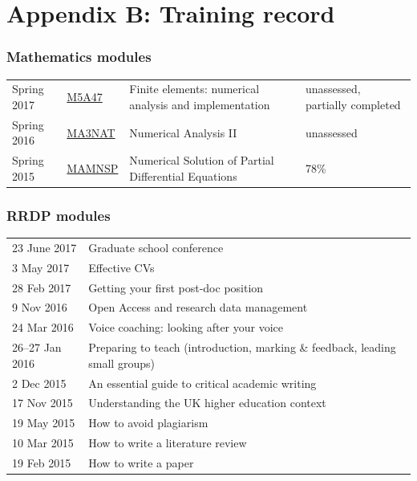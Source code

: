 \documentclass[a4paper,11pt]{article}
\begin{document}
\newpage

\section*{Appendix B: Training record}

\subsubsection*{Mathematics modules}
\footnotesize
\begin{tabular}{l l l l}
Spring 2017	& \href{https://finite-element.github.io}{M5A47}  & Finite elements: numerical analysis and implementation & unassessed, partially completed \\
Spring 2016	& \href{www.reading.ac.uk/module/document.aspx?modP=MA3NAT&modYR=1516}{MA3NAT} & Numerical Analysis II & unassessed \\
Spring 2015	& \href{www.reading.ac.uk/modules/document.aspx?modP=MAMNSP&modYR=1415}{MAMNSP} & Numerical Solution of Partial Differential Equations  & 78\% \\
\end{tabular}

\subsubsection*{RRDP modules}
\begin{tabular}{l l}
23 June 2017    & Graduate school conference \\
3 May 2017	& Effective CVs \\
28 Feb 2017	& Getting your first post-doc position \\
9 Nov 2016      & Open Access and research data management \\
24 Mar 2016	& Voice coaching: looking after your voice \\
26--27 Jan 2016 & Preparing to teach (introduction, marking \& feedback, leading small groups) \\
2 Dec 2015	& An essential guide to critical academic writing \\
17 Nov 2015	& Understanding the UK higher education context \\
19 May 2015	& How to avoid plagiarism \\
10 Mar 2015	& How to write a literature review \\
19 Feb 2015	& How to write a paper \\
\end{tabular}
\end{document}
